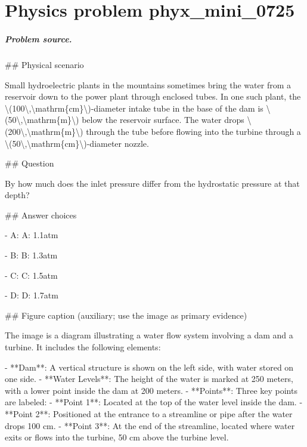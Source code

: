 
\chapter{Physics problem phyx\_mini\_0725}
\label{ch:PhyXMiniProblems_problem_phyx_mini_0725}

\paragraph{Problem source.}
\#\# Physical scenario

Small hydroelectric plants in the mountains sometimes bring the water from a reservoir down to the power plant through enclosed tubes. In one such plant, the \textbackslash{}(100\textbackslash{},\textbackslash{}mathrm\{cm\}\textbackslash{})-diameter intake tube in the base of the dam is \textbackslash{}(50\textbackslash{},\textbackslash{}mathrm\{m\}\textbackslash{}) below the reservoir surface. The water drops \textbackslash{}(200\textbackslash{},\textbackslash{}mathrm\{m\}\textbackslash{}) through the tube before flowing into the turbine through a \textbackslash{}(50\textbackslash{},\textbackslash{}mathrm\{cm\}\textbackslash{})-diameter nozzle.

\#\# Question

By how much does the inlet pressure differ from the hydrostatic pressure at that depth?

\#\# Answer choices

- A: A: 1.1atm

- B: B: 1.3atm

- C: C: 1.5atm

- D: D: 1.7atm

\#\# Figure caption (auxiliary; use the image as primary evidence)

The image is a diagram illustrating a water flow system involving a dam and a turbine. It includes the following elements:

- **Dam**: A vertical structure is shown on the left side, with water stored on one side.
- **Water Levels**: The height of the water is marked at 250 meters, with a lower point inside the dam at 200 meters.
- **Points**: Three key points are labeled:
  - **Point 1**: Located at the top of the water level inside the dam.
  - **Point 2**: Positioned at the entrance to a streamline or pipe after the water drops 100 cm.
  - **Point 3**: At the end of the streamline, located where water exits or flows into the turbine, 50 cm above the turbine level.
  
